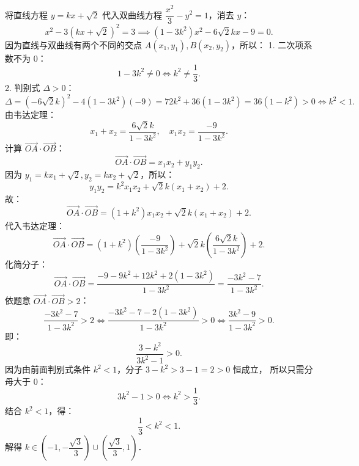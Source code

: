 \begin{answer}
将直线方程 $y = kx + \sqrt{2}$ 代入双曲线方程 $\dfrac{x^2}{3} - y^2 = 1$，消去 $y$：
\nopagebreak[4]
\[
x^2 - 3(kx + \sqrt{2})^2 = 3 \implies (1 - 3k^2)x^2 - 6\sqrt{2}kx - 9 = 0.
\]
因为直线与双曲线有两个不同的交点 $A(x_1, y_1), B(x_2, y_2)$，所以：
1. 二次项系数不为 0：
\nopagebreak[4]
\[
1 - 3k^2 \neq 0 \iff k^2 \neq \frac{1}{3}.
\]
2. 判别式 $\Delta > 0$：
\nopagebreak[4]
\[
\Delta = (-6\sqrt{2}k)^2 - 4(1 - 3k^2)(-9) = 72k^2 + 36(1 - 3k^2) = 36(1 - k^2) > 0 \iff k^2 < 1.
\]
由韦达定理：
\nopagebreak[4]
\[
x_1 + x_2 = \frac{6\sqrt{2}k}{1 - 3k^2}, \quad x_1 x_2 = \frac{-9}{1 - 3k^2}.
\]
计算 $\overrightarrow{OA} \cdot \overrightarrow{OB}$：
\nopagebreak[4]
\[
\overrightarrow{OA} \cdot \overrightarrow{OB} = x_1 x_2 + y_1 y_2.
\]
因为 $y_1 = kx_1 + \sqrt{2}, y_2 = kx_2 + \sqrt{2}$，所以：
\nopagebreak[4]
\[
y_1 y_2 = k^2 x_1 x_2 + \sqrt{2}k(x_1 + x_2) + 2.
\]
故：
\nopagebreak[4]
\[
\overrightarrow{OA} \cdot \overrightarrow{OB} = (1 + k^2)x_1 x_2 + \sqrt{2}k(x_1 + x_2) + 2.
\]
代入韦达定理：
\nopagebreak[4]
\[
\overrightarrow{OA} \cdot \overrightarrow{OB} = (1 + k^2)\left(\frac{-9}{1 - 3k^2}\right) + \sqrt{2}k\left(\frac{6\sqrt{2}k}{1 - 3k^2}\right) + 2.
\]
化简分子：
\nopagebreak[4]
\[
\overrightarrow{OA} \cdot \overrightarrow{OB} = \frac{-9 - 9k^2 + 12k^2 + 2(1 - 3k^2)}{1 - 3k^2} = \frac{-3k^2 - 7}{1 - 3k^2}.
\]
依题意 $\overrightarrow{OA} \cdot \overrightarrow{OB} > 2$：
\nopagebreak[4]
\[
\frac{-3k^2 - 7}{1 - 3k^2} > 2 \iff \frac{-3k^2 - 7 - 2(1 - 3k^2)}{1 - 3k^2} > 0 \iff \frac{3k^2 - 9}{1 - 3k^2} > 0.
\]
即：
\nopagebreak[4]
\[
\frac{3 - k^2}{3k^2 - 1} > 0.
\]
因为由前面判别式条件 $k^2 < 1$，分子 $3 - k^2 > 3 - 1 = 2 > 0$ 恒成立，
所以只需分母大于 0：
\nopagebreak[4]
\[
3k^2 - 1 > 0 \iff k^2 > \frac{1}{3}.
\]
结合 $k^2 < 1$，得：
\nopagebreak[4]
\[
\frac{1}{3} < k^2 < 1.
\]
解得 $k \in \left(-1, -\dfrac{\sqrt{3}}{3}\right) \cup \left(\dfrac{\sqrt{3}}{3}, 1\right)$．



\end{answer}
